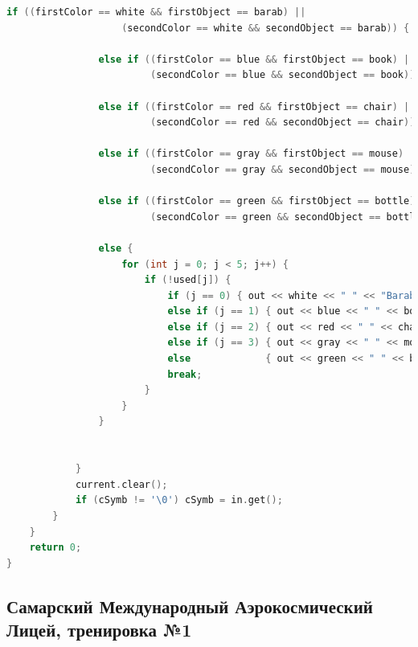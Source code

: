 \documentclass[a4paper,12pt]{article}
\begin{document}
\begin{lstlisting}[language=C++]
                if ((firstColor == white && firstObject == barab) ||
                    (secondColor == white && secondObject == barab)) { out << white << " " << "Barabashka" << endl; }

                else if ((firstColor == blue && firstObject == book) ||
                         (secondColor == blue && secondObject == book)) { out << blue << " " << book << endl; }

                else if ((firstColor == red && firstObject == chair) ||
                         (secondColor == red && secondObject == chair)) { out << red << " " << chair << endl; }

                else if ((firstColor == gray && firstObject == mouse) ||
                         (secondColor == gray && secondObject == mouse)) { out << gray << " " << mouse << endl; }

                else if ((firstColor == green && firstObject == bottle) ||
                         (secondColor == green && secondObject == bottle)) { out << green << " " << bottle << endl; }

                else {
                    for (int j = 0; j < 5; j++) {
                        if (!used[j]) {
                            if (j == 0) { out << white << " " << "Barabashka" << endl; }
                            else if (j == 1) { out << blue << " " << book << endl; }
                            else if (j == 2) { out << red << " " << chair << endl; }
                            else if (j == 3) { out << gray << " " << mouse << endl; }
                            else             { out << green << " " << bottle << endl; }
                            break;
                        }
                    }
                }


            }
            current.clear();
            if (cSymb != '\0') cSymb = in.get();
        }
    }
    return 0;
}
\end{lstlisting}



%
%
\newpage
\subsection{Самарский Международный Аэрокосмический Лицей, тренировка №1}
\end{document}
